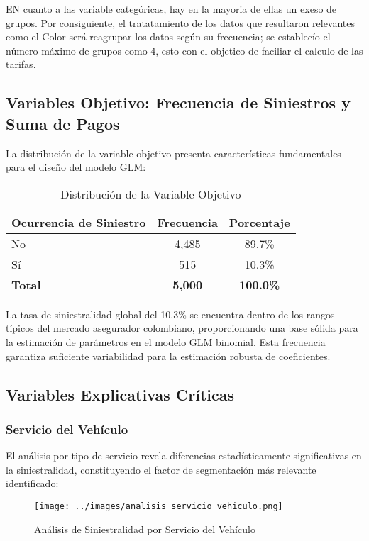 EN cuanto a las variable categóricas, hay en la mayoria de ellas un exeso de grupos. Por consiguiente, el tratatamiento de los datos que resultaron relevantes como el Color será reagrupar los datos según su frecuencia; se establecío el número máximo de grupos como 4, esto con el objetico de faciliar el calculo de las tarifas. 

\subsection{Variables Objetivo: Frecuencia de Siniestros y Suma de Pagos}

La distribución de la variable objetivo presenta características fundamentales para el diseño del modelo GLM:

\begin{table}[H]
\centering
\caption{Distribución de la Variable Objetivo}
\begin{tabular}{|l|c|c|}
\hline
\textbf{Ocurrencia de Siniestro} & \textbf{Frecuencia} & \textbf{Porcentaje} \\
\hline
No & 4,485 & 89.7\% \\
Sí & 515 & 10.3\% \\
\hline
\textbf{Total} & \textbf{5,000} & \textbf{100.0\%} \\
\hline
\end{tabular}
\end{table}

La tasa de siniestralidad global del 10.3\% se encuentra dentro de los rangos típicos del mercado asegurador colombiano, proporcionando una base sólida para la estimación de parámetros en el modelo GLM binomial. Esta frecuencia garantiza suficiente variabilidad para la estimación robusta de coeficientes.

\subsection{Variables Explicativas Críticas}

\subsubsection{Servicio del Vehículo}

El análisis por tipo de servicio revela diferencias estadísticamente significativas en la siniestralidad, constituyendo el factor de segmentación más relevante identificado:

\begin{figure}[H]
\centering
\texttt{[image: ../images/analisis\_servicio\_vehiculo.png]}
\caption{Análisis de Siniestralidad por Servicio del Vehículo}
\end{figure}

